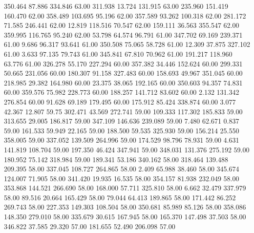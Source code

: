  350.464   87.886  334.846        63.00
 311.938   13.724  131.915        63.00
 235.960  151.419  160.470        62.00
 358.489  103.695   95.196        62.00
 357.589   93.262  100.318        62.00
 281.172   71.585  246.441        62.00
  12.819  118.516   70.547        62.00
 159.111   36.563  355.547        62.00
 359.995  116.765   95.240        62.00
  53.798   64.574   96.791        61.00
 347.702   69.169  239.371        61.00
   9.686   96.317   93.641        61.00
 350.508   75.065   58.728        61.00
  12.309   37.875  327.102        61.00
   3.633   97.135   79.743        61.00
 345.841   67.810   70.962        61.00
 191.217  118.960   63.776        61.00
 326.278   55.170  227.294        60.00
 357.382   34.446  152.624        60.00
 299.331   50.665  231.056        60.00
 180.307   91.158  327.483        60.00
 158.693   49.967  351.045        60.00
 218.985   29.382  164.980        60.00
  23.375   38.065  192.165        60.00
 350.603   94.357   74.831        60.00
 359.576   75.982  228.773        60.00
 188.257  141.712   83.602        60.00
   2.132  131.342  276.854        60.00
  91.628   69.189  179.495        60.00
 175.912   85.424  338.874        60.00
   3.077   42.367   12.807        59.75
 302.471   43.569  272.741        59.00
 109.333  117.302  185.833        59.00
 313.655   29.005  186.817        59.00
 347.109  146.636  239.089        59.00
   7.480   62.671    0.837        59.00
 161.533   59.949   22.165        59.00
 188.500   59.535  325.930        59.00
 156.214   25.550  358.005        59.00
 337.052  139.509  264.996        59.00
 174.529   98.796   78.931        59.00
   4.631  141.819  108.704        59.00
 197.350   46.424  347.941        59.00
 348.031  131.376  275.192        59.00
 180.952   75.142  318.984        59.00
 189.341   53.186  340.162        58.00
 318.464  139.488  209.395        58.00
 337.045  108.727  264.865        58.00
   2.409   65.988   38.460        58.00
 345.674  124.007   71.905        58.00
 341.420   19.935   16.535        58.00
 354.157   81.938  232.049        58.00
 353.868  144.521  266.690        58.00
 168.000   57.711  325.810        58.00
   6.662   32.479  337.979        58.00
  89.516   20.664  165.429        58.00
  79.044   64.413  189.865        58.00
 171.442   86.252  269.743        58.00
 227.353  149.303  108.504        58.00
 350.681   85.989   85.126        58.00
 358.086  148.350  279.010        58.00
 335.679   30.615  167.945        58.00
 165.370  147.498   37.503        58.00
 346.822   37.585   29.320        57.00
 181.655   52.490  206.098        57.00

